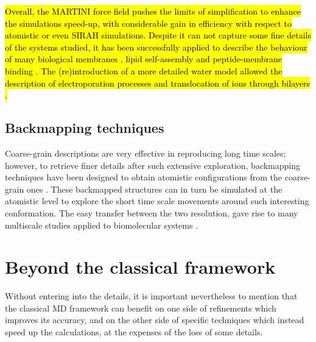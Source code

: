 \hl{Overall, the MARTINI force field pushes the limits of simplification to enhance the simulations speed-up, with considerable gain in efficiency with respect to atomistic or even SIRAH simulations. Despite it can not capture some fine details of the systems studied, it has been successfully applied to describe the behaviour of many biological membranes \cite{Khalid2019,Samsudin2017}, lipid self-assembly \cite{Marrink2007} and peptide-membrane binding \cite{Song2019}. The (re)introduction of a more detailed water model allowed the description of electroporation processes and translocation of ions through bilayers \cite{Yesylevskyy2010}.}

\subsection{Backmapping techniques} Coarse-grain descriptions are very effective in reproducing long time scales; however, to retrieve finer details after such extensive exploration, backmapping techniques have been designed to obtain atomistic configurations from the coarse-grain ones \cite{Wassenaar2015}. These backmapped structures can in turn be simulated at the atomistic level to explore the short time scale movements around such interesting conformation. The easy transfer between the two resolution, gave rise to many multiscale studies applied to biomolecular systems \cite{Lee2012}.


\section{Beyond the classical framework}

Without entering into the details, it is important nevertheless to mention that the classical MD framework can benefit on one side of refinements which improves its accuracy, and on the other side of specific techniques which instead speed up the calculations, at the expenses of the loss of some details.

